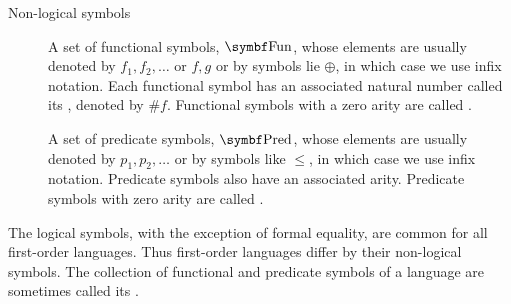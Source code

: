 \begin{definition}
\begin{description}
    \item[Non-logical symbols]
    \hfill
    \begin{defenum}[resume=def:first_order_language]
       A set of functional symbols, \( \bfop{Fun} \), whose elements are usually denoted by \( f_1, f_2, \ldots \) or \( f, g \) or by symbols lie \( \oplus \), in which case we use infix notation. Each functional symbol has an associated natural number called its , denoted by \( \# f \). Functional symbols with a zero arity are called .

       A set of predicate symbols, \( \bfop{Pred} \), whose elements are usually denoted by \( p_1, p_2, \ldots \) or by symbols like \( \leq \), in which case we use infix notation. Predicate symbols also have an associated arity. Predicate symbols with zero arity are called .
    \end{defenum}
  \end{description}

  The logical symbols, with the exception of formal equality, are common for all first-order languages. Thus first-order languages differ by their non-logical symbols. The collection of functional and predicate symbols of a language are sometimes called its .
\end{definition}

